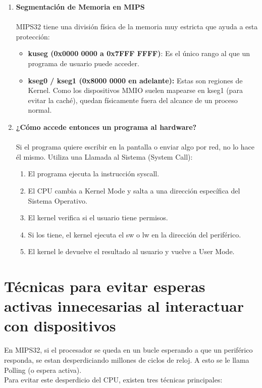 \documentclass[]{article}
\begin{document}
\begin{enumerate}
		\item \textbf{Segmentación de Memoria en MIPS}\\\\
			MIPS32 tiene una división física de la memoria muy estricta que ayuda a esta protección:
			\begin{itemize}
				\item \textbf{kuseg (0x0000 0000 a 0x7FFF FFFF)}: Es el único rango al que un programa de usuario puede acceder.
				\item \textbf{kseg0 / kseg1 (0x8000 0000 en adelante):} Estas son regiones de Kernel. Como los dispositivos MMIO suelen mapearse en kseg1 (para evitar la caché), quedan físicamente fuera del alcance de un proceso normal.
			\end{itemize}
		\item \textbf{¿Cómo accede entonces un programa al hardware?}\\\\
			Si el programa quiere escribir en la pantalla o enviar algo por red, no lo hace él mismo. Utiliza una Llamada al Sistema (System Call):
			\begin{enumerate}
				\item El programa ejecuta la instrucción syscall.
				\item El CPU cambia a Kernel Mode y salta a una dirección específica del Sistema Operativo.
				\item El kernel verifica si el usuario tiene permisos.
				\item Si los tiene, el kernel ejecuta el sw o lw en la dirección del periférico.
				\item El kernel le devuelve el resultado al usuario y vuelve a User Mode.
			\end{enumerate}
			
	\end{enumerate}
	
\section{Técnicas para evitar esperas activas innecesarias al interactuar
	con dispositivos}
	En MIPS32, si el procesador se queda en un bucle esperando a que un periférico responda, se estan desperdiciando millones de ciclos de reloj. A esto se le llama Polling (o espera activa).\\
	
	Para evitar este desperdicio del CPU, existen tres técnicas principales:
	
\end{document}
